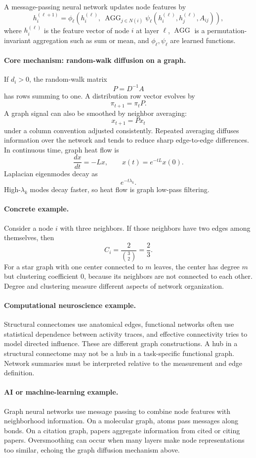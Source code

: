 A message-passing neural network updates node features by
\[
h_i^{(\ell+1)}
=\phi_\ell\!\left(h_i^{(\ell)},\ \operatorname{AGG}_{j\in N(i)}\psi_\ell(h_i^{(\ell)},h_j^{(\ell)},A_{ij})\right),
\]
where \(h_i^{(\ell)}\) is the feature vector of node \(i\) at layer \(\ell\), \(\operatorname{AGG}\) is a permutation-invariant aggregation such as sum or mean, and \(\phi_\ell,\psi_\ell\) are learned functions.

\paragraph{Core mechanism: random-walk diffusion on a graph.}
If \(d_i>0\), the random-walk matrix
\[
P=D^{-1}A
\]
has rows summing to one. A distribution row vector evolves by
\[
\pi_{t+1}=\pi_t P.
\]
A graph signal can also be smoothed by neighbor averaging:
\[
x_{t+1}=Px_t
\]
under a column convention adjusted consistently. Repeated averaging diffuses information over the network and tends to reduce sharp edge-to-edge differences. In continuous time, graph heat flow is
\[
\frac{dx}{dt}=-Lx,
\qquad
x(t)=e^{-tL}x(0).
\]
Laplacian eigenmodes decay as
\[
e^{-t\lambda_k}.
\]
High-\(\lambda_k\) modes decay faster, so heat flow is graph low-pass filtering.

\paragraph{Concrete example.}
Consider a node \(i\) with three neighbors. If those neighbors have two edges among themselves, then
\[
C_i=\frac{2}{\binom32}=\frac23.
\]
For a star graph with one center connected to \(m\) leaves, the center has degree \(m\) but clustering coefficient \(0\), because its neighbors are not connected to each other. Degree and clustering measure different aspects of network organization.

\paragraph{Computational neuroscience example.}
Structural connectomes use anatomical edges, functional networks often use statistical dependence between activity traces, and effective connectivity tries to model directed influence. These are different graph constructions. A hub in a structural connectome may not be a hub in a task-specific functional graph. Network summaries must be interpreted relative to the measurement and edge definition.

\paragraph{AI or machine-learning example.}
Graph neural networks use message passing to combine node features with neighborhood information. On a molecular graph, atoms pass messages along bonds. On a citation graph, papers aggregate information from cited or citing papers. Oversmoothing can occur when many layers make node representations too similar, echoing the graph diffusion mechanism above.

